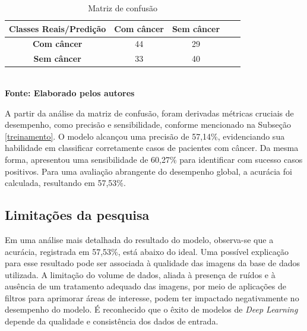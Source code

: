 \begin{table}[h]
  \centering
  \caption{Matriz de confusão}
   \label{tab:confusion}
   \vspace{-0.2cm}
\begin{tabular}{|c|c|c|c|c|} 
  \hline
    Classes Reais/Predição & \textbf{Com câncer} & \textbf{Sem câncer}  \\
  \hline
    \textbf{Com câncer} & 44 & 29 \\
  \hline
    \textbf{Sem câncer} & 33 & 40 \\
  \hline
\end{tabular}
	\vspace{0.2cm}
     \\\textbf{\footnotesize Fonte: Elaborado pelos autores}
\end{table}



A partir da análise da matriz de confusão, foram derivadas métricas cruciais de desempenho, como precisão e sensibilidade, conforme mencionado na Subseção \ref{treinamento}. O modelo alcançou uma precisão de 57,14\%, evidenciando sua habilidade em classificar corretamente casos de pacientes com câncer. Da mesma forma, apresentou uma sensibilidade de 60,27\% para identificar com sucesso casos positivos. Para uma avaliação abrangente do desempenho global, a acurácia foi calculada, resultando em 57,53\%.


\subsection{Limitações da pesquisa}

Em uma análise mais detalhada do resultado do modelo, observa-se que a acurácia, registrada em 57,53\%, está abaixo do ideal. Uma possível explicação para esse resultado pode ser associada à qualidade das imagens da base de dados utilizada. A limitação do volume de dados, aliada à presença de ruídos e à ausência de um tratamento adequado das imagens, por meio de aplicações de filtros para aprimorar áreas de interesse, podem ter impactado negativamente no desempenho do modelo. É reconhecido que o êxito de modelos de \textit{Deep Learning} depende da qualidade e consistência dos dados de entrada.

